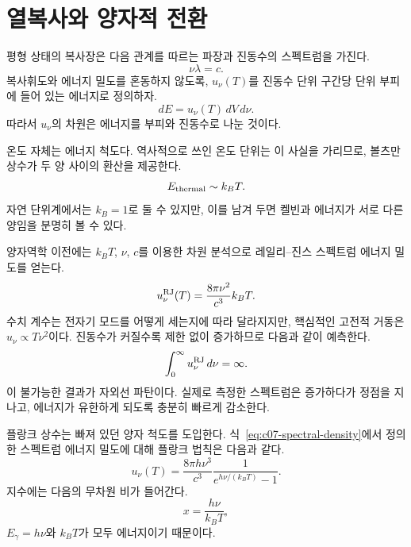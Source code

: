 \section{열복사와 양자적 전환}

평형 상태의 복사장은 다음 관계를 따르는 파장과 진동수의 스펙트럼을 가진다.
\begin{equation}
\nu\lambda=c.
\end{equation}
복사휘도와 에너지 밀도를 혼동하지 않도록, \(u_\nu(T)\)를 진동수 단위 구간당 단위 부피에 들어 있는 에너지로 정의하자.
\begin{equation}
dE=u_\nu(T)\,dV\,d\nu.
\label{eq:c07-spectral-density}
\end{equation}
따라서 \(u_\nu\)의 차원은 에너지를 부피와 진동수로 나눈 것이다.

온도 자체는 에너지 척도다. 역사적으로 쓰인 온도 단위는 이 사실을 가리므로, 볼츠만 상수가 두 양 사이의 환산을 제공한다.
\begin{equation}
E_{\rm thermal}\sim k_B T.
\end{equation}
자연 단위계에서는 \(k_B=1\)로 둘 수 있지만, 이를 남겨 두면 켈빈과 에너지가 서로 다른 양임을 분명히 볼 수 있다.

양자역학 이전에는 \(k_BT\), \(\nu\), \(c\)를 이용한 차원 분석으로 레일리--진스 스펙트럼 에너지 밀도를 얻는다.
\begin{equation}
u_\nu^{\rm RJ}(T)=\frac{8\pi\nu^2}{c^3}k_BT.
\label{eq:c07-rayleigh-jeans}
\end{equation}
수치 계수는 전자기 모드를 어떻게 세는지에 따라 달라지지만, 핵심적인 고전적 거동은 \(u_\nu\propto T\nu^2\)이다. 진동수가 커질수록 제한 없이 증가하므로 다음과 같이 예측한다.
\begin{equation}
\int_0^\infty u_\nu^{\rm RJ}\,d\nu=\infty.
\end{equation}
이 불가능한 결과가 자외선 파탄이다. 실제로 측정한 스펙트럼은 증가하다가 정점을 지나고, 에너지가 유한하게 되도록 충분히 빠르게 감소한다.

플랑크 상수는 빠져 있던 양자 척도를 도입한다. 식~\eqref{eq:c07-spectral-density}에서 정의한 스펙트럼 에너지 밀도에 대해 플랑크 법칙은 다음과 같다.
\begin{equation}
u_\nu(T)
=
\frac{8\pi h\nu^3}{c^3}
\frac{1}{e^{h\nu/(k_BT)}-1}.
\label{eq:c07-planck}
\end{equation}
지수에는 다음의 무차원 비가 들어간다.
\begin{equation}
x=\frac{h\nu}{k_BT},
\end{equation}
\(E_\gamma=h\nu\)와 \(k_BT\)가 모두 에너지이기 때문이다.

